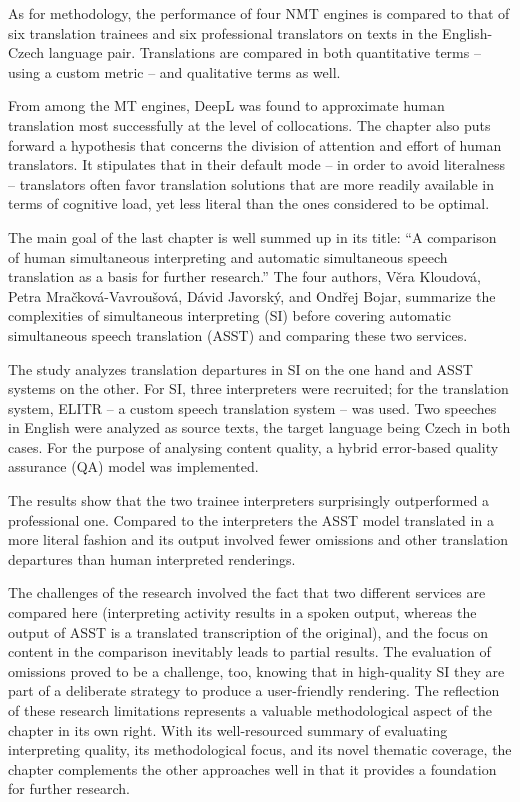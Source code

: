 \documentclass[output=paper]{langscibook}
\begin{document}
As for methodology, the performance of four NMT engines is compared to that of six translation trainees and six professional translators on texts in the English-Czech language pair. Translations are compared in both quantitative terms – using a custom metric – and qualitative terms as well.

From among the MT engines, DeepL was found to approximate human translation most successfully at the level of collocations. The chapter also puts forward a hypothesis that concerns the division of attention and effort of human translators. It stipulates that in their default mode – in order to avoid literalness – translators often favor translation solutions that are more readily available in terms of cognitive load, yet less literal than the ones considered to be optimal.

The main goal of the last chapter is well summed up in its title: “A comparison of human simultaneous interpreting and automatic simultaneous speech translation as a basis for further research.” The four authors, Věra Kloudová, Petra Mračková-Vavroušová, Dávid Javorský, and Ondřej Bojar, summarize the complexities of simultaneous interpreting (SI) before covering automatic simultaneous speech translation (ASST) and comparing these two services.

The study analyzes translation departures in SI on the one hand and ASST systems on the other. For SI, three interpreters were recruited; for the translation system, ELITR – a custom speech translation system – was used. Two speeches in English were analyzed as source texts, the target language being Czech in both cases. For the purpose of analysing content quality, a hybrid error-based quality assurance (QA) model was implemented.

The results show that the two trainee interpreters surprisingly outperformed a professional one. Compared to the interpreters the ASST model translated in a more literal fashion and its output involved fewer omissions and other translation departures than human interpreted renderings.

The challenges of the research involved the fact that two different services are compared here (interpreting activity results in a spoken output, whereas the output of ASST is a translated transcription of the original), and the focus on content in the comparison inevitably leads to partial results. The evaluation of omissions proved to be a challenge, too, knowing that in high-quality SI they are part of a deliberate strategy to produce a user-friendly rendering. The reflection of these research limitations represents a valuable methodological aspect of the chapter in its own right. With its well-resourced summary of evaluating interpreting quality, its methodological focus, and its novel thematic coverage, the chapter complements the other approaches well in that it provides a foundation for further research.
\end{document}

